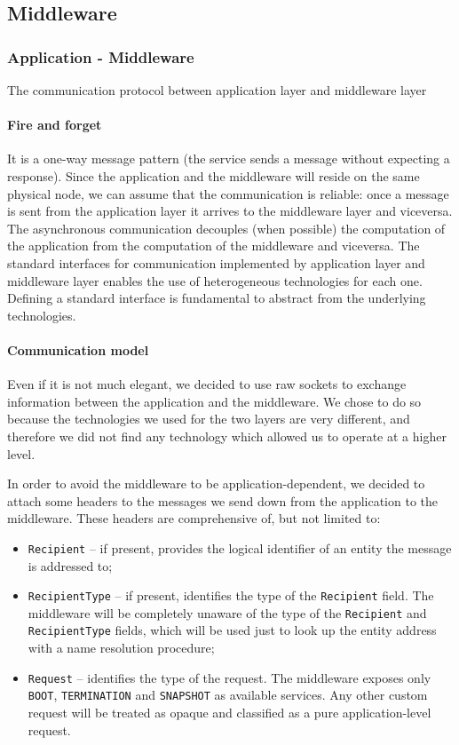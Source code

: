 \subsection{Middleware}
\subsubsection{Application - Middleware}
The communication protocol between application layer and middleware layer
\paragraph{Fire and forget}
It is a one-way message pattern (the service sends a message without expecting
a response). Since the application and the middleware will reside on the same
physical node, we can assume that the communication is reliable: once a message
is sent from the application layer it arrives to the middleware layer and
viceversa. The asynchronous communication decouples (when possible)
the computation of the application from the computation of the middleware
and viceversa. The standard interfaces for communication
implemented by application layer and middleware layer enables the use of
heterogeneous technologies for each one. Defining a standard interface
is fundamental to abstract from the underlying technologies.

\paragraph{Communication model}
Even if it is not much elegant, we decided to use raw sockets to exchange
information between the application and the middleware.
We chose to do so because the technologies we used for the two layers are very
different, and therefore we did not find any technology which allowed us to
operate at a higher level.

In order to avoid the middleware to be application-dependent, we decided to
attach some headers to the messages we send down from the application to the
middleware.
These headers are comprehensive of, but not limited to:
\begin{itemize}
  \item \texttt{Recipient} -- if present, provides the logical identifier of an
    entity the message is addressed to;
  \item \texttt{RecipientType} -- if present, identifies the type of the
    \texttt{Recipient} field. The middleware will be completely unaware
    of the type of the \texttt{Recipient} and \texttt{RecipientType} fields,
    which will be used just to look up the entity address with a name
    resolution procedure;
  \item \texttt{Request} -- identifies the type of the request. The middleware
    exposes only \texttt{BOOT}, \texttt{TERMINATION} and \texttt{SNAPSHOT} as
    available services. Any other custom request will be treated as opaque and
    classified as a pure application-level request.
\end{itemize}

